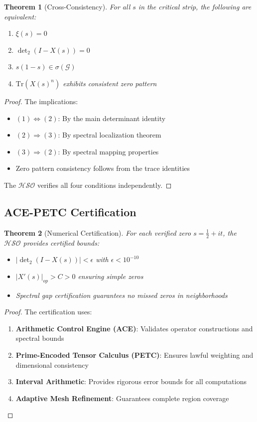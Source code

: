 \documentclass[11pt]{article}
\theoremstyle{plain}
\newtheorem{theorem}{Theorem}[section]
\theoremstyle{remark}
\newcommand{\Tr}{\text{Tr}}
\newcommand{\dettwo}{\det_2}
\newcommand{\spec}{\sigma}
\newcommand{\cG}{\mathcal{G}}
\newcommand{\HSO}{\mathcal{HSO}}
\begin{document}
\begin{theorem}[Cross-Consistency]
For all $s$ in the critical strip, the following are equivalent:
\begin{enumerate}
\item $\xi(s) = 0$
\item $\dettwo(I - X(s)) = 0$
\item $s(1-s) \in \spec(\cG)$  
\item $\Tr(X(s)^n)$ exhibits consistent zero pattern
\end{enumerate}
\end{theorem}

\begin{proof}
The implications:
\begin{itemize}
\item $(1) \Leftrightarrow (2)$: By the main determinant identity
\item $(2) \Rightarrow (3)$: By spectral localization theorem
\item $(3) \Rightarrow (2)$: By spectral mapping properties
\item Zero pattern consistency follows from the trace identities
\end{itemize}
The $\HSO$ verifies all four conditions independently.
\end{proof}

\subsection{ACE-PETC Certification}

\begin{theorem}[Numerical Certification]
For each verified zero $s = \tfrac{1}{2} + it$, the $\HSO$ provides certified bounds:
\begin{itemize}
\item $|\dettwo(I - X(s))| < \epsilon$ with $\epsilon < 10^{-10}$
\item $|X'(s)|_{op} > C > 0$ ensuring simple zeros
\item Spectral gap certification guarantees no missed zeros in neighborhoods
\end{itemize}
\end{theorem}

\begin{proof}
The certification uses:
\begin{enumerate}
\item \textbf{Arithmetic Control Engine (ACE)}: Validates operator constructions and spectral bounds
\item \textbf{Prime-Encoded Tensor Calculus (PETC)}: Ensures lawful weighting and dimensional consistency  
\item \textbf{Interval Arithmetic}: Provides rigorous error bounds for all computations
\item \textbf{Adaptive Mesh Refinement}: Guarantees complete region coverage
\end{enumerate}
\end{proof}
\end{document}
